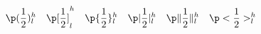 \[
    \p ( \frac12  )_l^h \quad
    \p [ \frac12  ]_l^h \quad
    \p\{ \frac12 \}_l^h \quad
    \p | \frac12  |_l^h \quad
    \p\| \frac12 \|_l^h \quad
    \p < \frac12  >_l^h
\]
